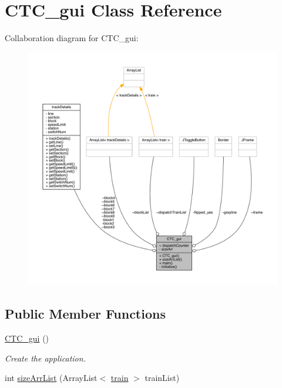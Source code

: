 \hypertarget{classCTC__gui}{}\section{C\+T\+C\+\_\+gui Class Reference}
\label{classCTC__gui}


Collaboration diagram for C\+T\+C\+\_\+gui\+:
\nopagebreak
\begin{figure}[H]
\begin{center}
\leavevmode
\includegraphics[width=350pt]{classCTC__gui__coll__graph}
\end{center}
\end{figure}
\subsection*{Public Member Functions}
\begin{DoxyCompactItemize}
\item 
\hyperlink{classCTC__gui_a2e77261492fe815cec81ff396aaeb5f9}{C\+T\+C\+\_\+gui} ()
\begin{DoxyCompactList}\small\item\em Create the application. \end{DoxyCompactList}\item 
int \hyperlink{classCTC__gui_a985c2650c57b753dcc510ebccc169c63}{size\+Arr\+List} (Array\+List$<$ \hyperlink{classtrain}{train} $>$ train\+List)
\end{DoxyCompactItemize}
